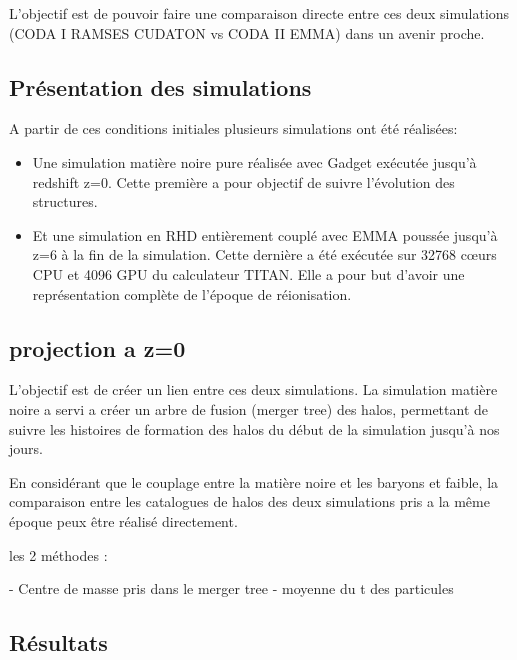 L'objectif est de pouvoir faire une comparaison directe entre ces deux simulations (CODA I RAMSES CUDATON vs CODA II EMMA) dans un avenir proche.



\subsection{Présentation des simulations}

A partir de ces conditions initiales plusieurs simulations ont été réalisées:

\begin{itemize}
\item Une simulation matière noire pure réalisée avec Gadget %
exécutée jusqu'à redshift z=0.
Cette première a pour objectif de suivre l'évolution des structures.

\item Et une simulation en RHD entièrement couplé avec EMMA poussée jusqu'à z=6 à la fin de la simulation.
Cette dernière a été exécutée sur 32768 cœurs CPU et 4096 GPU du calculateur TITAN.
Elle a pour but d'avoir une représentation complète de l'époque de réionisation.
\end{itemize}



\subsection{projection a z=0}

L'objectif est de créer un lien entre ces deux simulations.
La simulation matière noire a servi a créer un arbre de fusion (merger tree) des halos, permettant de suivre les histoires de formation des halos du début de la simulation jusqu'à nos jours.

En considérant que le couplage entre la matière noire et les baryons et faible, la comparaison entre les catalogues de halos des deux simulations pris a la même époque peux être réalisé directement.


les 2 méthodes :

- Centre de masse pris dans le merger tree
- moyenne du t des particules



\subsection{Résultats}


